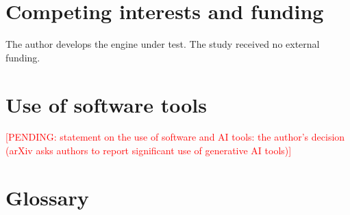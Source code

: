 \documentclass{article}
\newif\iffinal
\newif\ifanon
\newcommand{\pending}[1]{\iffinal\PackageError{paper}{Pending content: #1}{Fill it from the artifact before the final build.}\else\textcolor{red}{[PENDING: #1]}\fi}
\begin{document}
\section*{Competing interests and funding}
The author develops the engine under test. The study received no external funding.

\ifanon\else\section*{Use of software tools}
\pending{statement on the use of software and AI tools: the author's decision (arXiv asks authors to report significant use of generative AI tools)}\fi

\clearpage



\appendix
\section{Glossary}
\label{app:glossary}
\end{document}
